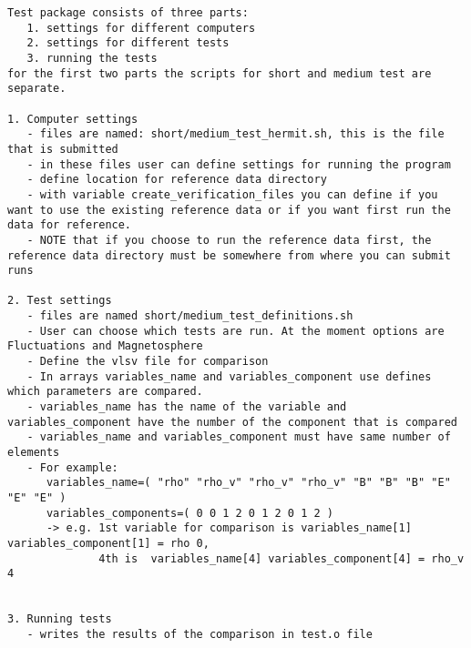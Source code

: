 \documentclass[a4paper,10pt]{article}
\begin{document}
\begin{verbatim}
Test package consists of three parts:
   1. settings for different computers
   2. settings for different tests
   3. running the tests
for the first two parts the scripts for short and medium test are separate.

1. Computer settings
   - files are named: short/medium_test_hermit.sh, this is the file that is submitted
   - in these files user can define settings for running the program
   - define location for reference data directory
   - with variable create_verification_files you can define if you want to use the existing reference data or if you want first run the data for reference.
   - NOTE that if you choose to run the reference data first, the reference data directory must be somewhere from where you can submit runs

2. Test settings
   - files are named short/medium_test_definitions.sh
   - User can choose which tests are run. At the moment options are Fluctuations and Magnetosphere
   - Define the vlsv file for comparison
   - In arrays variables_name and variables_component use defines which parameters are compared.
   - variables_name has the name of the variable and variables_component have the number of the component that is compared
   - variables_name and variables_component must have same number of elements
   - For example:
      variables_name=( "rho" "rho_v" "rho_v" "rho_v" "B" "B" "B" "E" "E" "E" )
      variables_components=( 0 0 1 2 0 1 2 0 1 2 )
      -> e.g. 1st variable for comparison is variables_name[1] variables_component[1] = rho 0,
              4th is  variables_name[4] variables_component[4] = rho_v 4


3. Running tests
   - writes the results of the comparison in test.o file
\end{verbatim}
\end{document}
